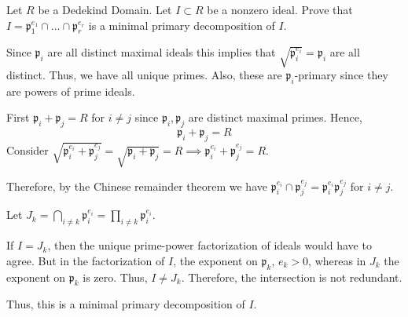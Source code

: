\documentclass[12pt, letterpaper]{article}
\newcommand{\p}{\mathfrak{p}}
\begin{document}
\color{\TextColor}
\pagecolor{\colormode}
\setlength{\parindent}{0pt}
\pagestyle{fancy}
\fancyhf{}

\begin{problem}{}
    Let $R$ be a Dedekind Domain. Let $I \subset R$ be a nonzero ideal. Prove that $I = \p_1^{e_1} \cap \dots \cap \p_r^{e_r}$ is a minimal primary
    decomposition of $I$.
\end{problem}
\begin{problemproof}
    Since $\p_i$ are all distinct maximal ideals this implies that $\sqrt{\p_i^{e_i}}=\p_i$ are all distinct. Thus, we have all unique primes.
    Also, these are $\p_i$-primary since they are powers of prime ideals.

    First $\p_i + \p_j = R$ for $i \neq j$ since $\p_i,\p_j$ are distinct maximal primes. Hence,
    \[\p_i + \p_j = R\]
    Consider $\sqrt{\p_i^{e_i} + \p_j^{e_j}}=\sqrt{\p_i + \p_j}=R \implies \p_i^{e_i} + \p_j^{e_j}=R$.

    Therefore, by the Chinese remainder theorem we have $\p_i^{e_i} \cap \p_j^{e_j} = \p_i^{e_i}\p_j^{e_j}$ for $i \neq j$.

    Let $J_k = \bigcap_{i \neq k}\p_i^{e_i} = \prod_{i \neq k}\p_i^{e_i}$.

    If $I = J_k$, then the unique prime-power factorization of ideals would have to agree. But in the factorization of $I$, the exponent on $\p_k$, $e_k > 0$, whereas
    in $J_k$ the exponent on $\p_k$ is zero. Thus, $I \neq J_k$. Therefore, the intersection is not redundant.
    
    Thus, this is a minimal primary decomposition of $I$.
\end{problemproof}
\end{document}
